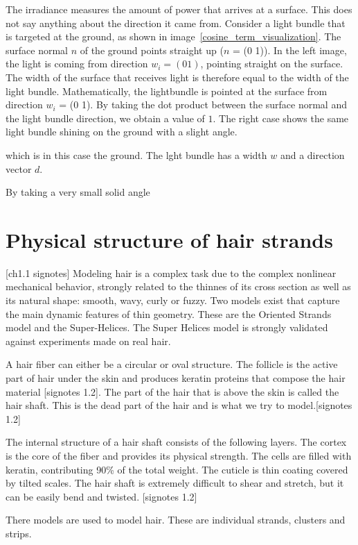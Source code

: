 \documentclass[11pt,a4paper]{report}
\begin{document}
The irradiance measures the amount of power that arrives at a surface. This does not say anything about the direction it came from. Consider a light bundle that is targeted at the ground, as shown in image~\ref{cosine_term_visualization}. The surface normal $n$ of the ground points straight up ($n$ = (0 1)). In the left image, the light is coming from direction $w_i = (0 1)$, pointing straight on the surface. The width of the surface that receives light is therefore equal to the width of the light bundle. Mathematically, the lightbundle is pointed at the surface from direction $w_i$ = (0 1). By taking the dot product between the surface normal and the light bundle direction, we obtain a value of $1$. The right case shows the same light bundle shining on the ground with a slight angle.

 which is in this case the ground. The lght bundle has a width $w$ and a direction vector $d$. 

By taking a very small solid angle 


\section{Physical structure of hair strands}

[ch1.1 signotes] Modeling hair is a complex task due to the complex nonlinear mechanical behavior, strongly related to the thinnes of its cross section as well as its natural shape: smooth, wavy, curly or fuzzy. Two models exist that capture the main dynamic features of thin geometry. These are the Oriented Strands model and the Super-Helices. The Super Helices model is strongly validated against experiments made on real hair.

A hair fiber can either be a circular or oval structure. The follicle is the active part of hair under the skin and produces keratin proteins that compose the hair material [signotes 1.2]. The part of the hair that is above the skin is called the hair shaft. This is the dead part of the hair and is what we try to model.[signotes 1.2] 


The internal structure of a hair shaft consists of the following layers. The cortex is the core of the fiber and provides its physical strength. The cells are filled with keratin, contributing 90\% of the total weight. The cuticle is thin coating covered by tilted scales.
The hair shaft is extremely difficult to shear and stretch, but it can be easily bend and twisted. [signotes 1.2]


There models are used to model hair. These are individual strands, clusters and strips.
\end{document}
